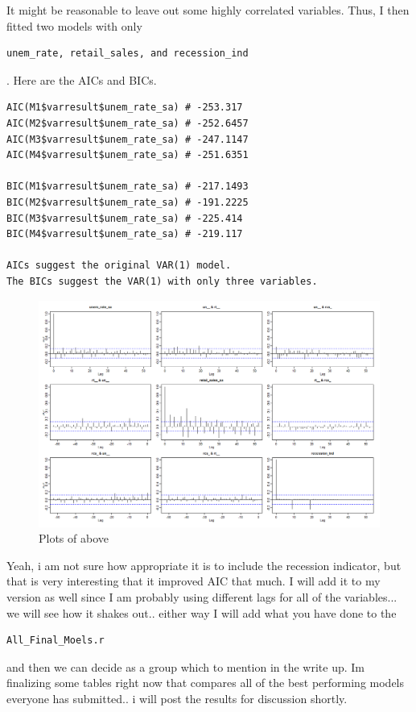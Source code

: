 \documentclass[twoside,twocolumn]{article}
\begin{document}
It might be reasonable to leave out some highly correlated variables. Thus, I then fitted two models with only \begin{verbatim}unem_rate, retail_sales, and recession_ind\end{verbatim}. Here are the AICs and BICs.

\begin{verbatim}
AIC(M1$varresult$unem_rate_sa) # -253.317
AIC(M2$varresult$unem_rate_sa) # -252.6457
AIC(M3$varresult$unem_rate_sa) # -247.1147
AIC(M4$varresult$unem_rate_sa) # -251.6351

BIC(M1$varresult$unem_rate_sa) # -217.1493
BIC(M2$varresult$unem_rate_sa) # -191.2225
BIC(M3$varresult$unem_rate_sa) # -225.414
BIC(M4$varresult$unem_rate_sa) # -219.117

AICs suggest the original VAR(1) model. 
The BICs suggest the VAR(1) with only three variables. 
\end{verbatim}

    \begin{figure}[H]
    	\centering
     	\caption{Plots of above}
     	\includegraphics[width=\linewidth]{images/boplots}
 \end{figure}

Yeah, i am not sure how appropriate it is to include the recession indicator, but that is very interesting that it improved AIC that much. I will add it to my version as well since I am probably using different lags for all of the variables... we will see how it shakes out.. either way I will add what you have done to the \begin{verbatim}All_Final_Moels.r\end{verbatim} and then we can decide as a group which to mention in the write up. Im finalizing some tables right now that compares all of the best performing models everyone has submitted.. i will post the results for discussion shortly.
\end{document}
